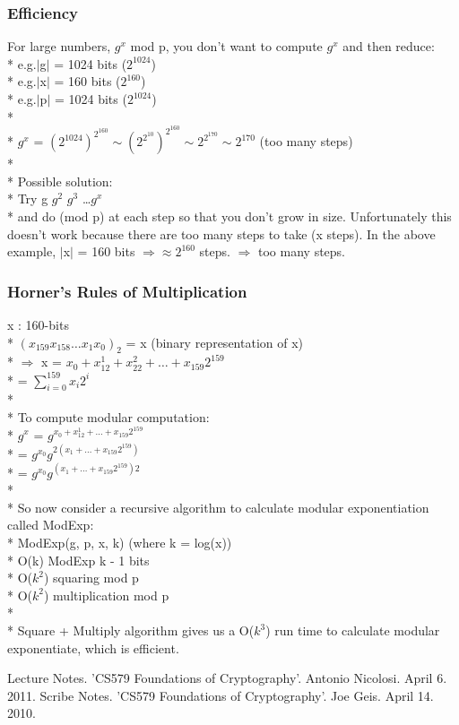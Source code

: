 \documentclass[11pt]{article}
\begin{document}
\subsubsection{Efficiency}
For large numbers, $g^x$ mod p, you don't want to compute $g^x$ and then
reduce:\\*
\indent e.g.\indent $\lvert$g$\rvert$ = 1024 bits ($2^{1024}$)\\*
\indent e.g.\indent $\lvert$x$\rvert$ = 160 bits ($2^{160}$)\\*
\indent e.g.\indent $\lvert$p$\rvert$ = 1024 bits ($2^{1024}$)\\*\\*
$g^x$ = $(2^{1024})^{2^{160}} \sim (2^{2^{10}})^{2^{160}} \sim 2^{2^{170}} \sim
2^{170}$ \indent (too many steps)\\*\\*
Possible solution:\\*
 Try \indent g \indent $g^2$ \indent $g^3$ \indent \ldots \indent $g^x$\\*
 and do (mod p) at each step so that you don't grow in size.  Unfortunately this
 doesn't work because there are too many steps to take (x steps).  In the above
 example, $\lvert$x$\rvert$ = 160 bits $\Longrightarrow \approx 2^{160}$ steps.
 $\Longrightarrow$ too many steps.
 
\subsubsection{Horner's Rules of Multiplication}
 x : 160-bits\\*
 $(x_{159} x_{158} \ldots x_1 x_0)_2$ = x (binary representation of x)\\*
 $\Longrightarrow$ x = $x_0 + x_12^1 + x_22^2 + \ldots + x_{159}2^{159}$\\*
 \indent = $\displaystyle\sum\limits_{i=0}^{159} x_i2^i$\\*\\*
 To compute modular computation:\\*
 \indent $g^x$ = $g^{x_0+x_12^1+\ldots+x_{159}2^{159}}$\\*
 \indent \indent = $g^{x_0} g^{2(x_1+\ldots+x_{159}2^{159})}$\\*
 \indent \indent = $g^{x_0} g^{(x_1+\ldots+x_{159}2^{159})2}$\\*\\*
 So now consider a recursive algorithm to calculate modular exponentiation
 called ModExp:\\*
 ModExp(g, p, x, k) (where k = log(x))\\*
 \indent O(k) \indent ModExp k - 1 bits\\*
 \indent O($k^2$) \indent squaring mod p\\*
 \indent O($k^2$) \indent multiplication mod p\\*\\*
 Square + Multiply algorithm gives us a O($k^3$) run time to calculate modular
 exponentiate, which is efficient.
 
\begin{thebibliography}{99}
 Lecture Notes. 'CS579 Foundations of Cryptography'.
Antonio Nicolosi. April 6. 2011.
 Scribe Notes. 'CS579 Foundations of Cryptography'. Joe
Geis. April 14. 2010.
\end{thebibliography}
\end{document}
